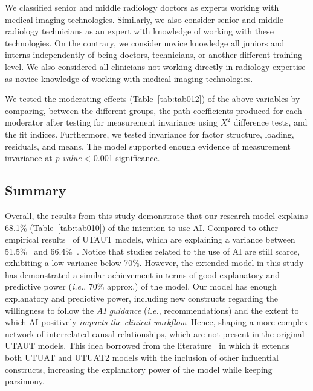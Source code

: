 We classified senior and middle radiology doctors as experts working with medical imaging technologies.
Similarly, we also consider senior and middle radiology technicians as an expert with knowledge of working with these technologies.
On the contrary, we consider novice knowledge all juniors and interns independently of being doctors, technicians, or another different training level.
We also considered all clinicians not working directly in radiology expertise as novice knowledge of working with medical imaging technologies.



We tested the moderating effects (Table~\ref{tab:tab012}) of the above variables by comparing, between the different groups, the path coefficients produced for each moderator after testing for measurement invariance using $X^2$ difference tests, and the fit indices.
Furthermore, we tested invariance for factor structure, loading, residuals, and means.
The model supported enough evidence of measurement invariance at {\it p-value} < 0.001 significance.



\subsection{Summary}
\label{sec:chap004005005}

Overall, the results from this study demonstrate that our research model explains 68.1\% (Table~\ref{tab:tab010}) of the intention to use AI.
Compared to other empirical results~\cite{LIU2022107026, info:doi/10.2196/14316} of UTAUT models, which are explaining a variance between 51.5\%~\cite{LIU2022107026} and 66.4\%~\cite{info:doi/10.2196/14316}.
Notice that studies related to the use of AI are still scarce, exhibiting a low variance below 70\%.
However, the extended model in this study has demonstrated a similar achievement in terms of good explanatory and predictive power ({\it i.e.}, 70\% approx.) of the model.
Our model has enough explanatory and predictive power, including new constructs regarding the willingness to follow the {\it AI guidance} ({\it i.e.}, recommendations) and the extent to which AI positively {\it impacts the clinical workflow}.
Hence, shaping a more complex network of interrelated causal relationships, which are not present in the original UTAUT models.
This idea borrowed from the literature~\cite{KHALILZADEH2017460, SIGERSON201887} in which it extends both UTUAT and UTUAT2 models with the inclusion of other influential constructs, increasing the explanatory power of the model while keeping parsimony.

